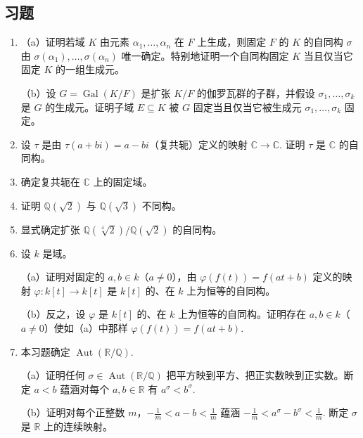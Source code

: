 \subsection*{习题}

\begin{enumerate}
\item （a）证明若域 \(K\) 由元素 \(\alpha_1, \ldots, \alpha_n\) 在 \(F\) 上生成，则固定 \(F\) 的 \(K\) 的自同构 \(\sigma\) 由 \(\sigma(\alpha_1), \ldots, \sigma(\alpha_n)\) 唯一确定。特别地证明一个自同构固定 \(K\) 当且仅当它固定 \(K\) 的一组生成元。

（b）设 \(G = \operatorname{Gal}(K/F)\) 是扩张 \(K/F\) 的伽罗瓦群的子群，并假设 \(\sigma_1, \ldots, \sigma_k\) 是 \(G\) 的生成元。证明子域 \(E \subseteq K\) 被 \(G\) 固定当且仅当它被生成元 \(\sigma_1, \ldots, \sigma_k\) 固定。

\item 设 \(\tau\) 是由 \(\tau(a+bi) = a-bi\)（复共轭）定义的映射 \(\mathbb{C} \to \mathbb{C}\). 证明 \(\tau\) 是 \(\mathbb{C}\) 的自同构。

\item 确定复共轭在 \(\mathbb{C}\) 上的固定域。

\item 证明 \(\mathbb{Q}(\sqrt{2})\) 与 \(\mathbb{Q}(\sqrt{3})\) 不同构。

\item 显式确定扩张 \(\mathbb{Q}(\sqrt[4]{2})/\mathbb{Q}(\sqrt{2})\) 的自同构。

\item 设 \(k\) 是域。

（a）证明对固定的 \(a, b \in k\)（\(a \neq 0\)），由 \(\varphi(f(t)) = f(at+b)\) 定义的映射 \(\varphi : k[t] \to k[t]\) 是 \(k[t]\) 的、在 \(k\) 上为恒等的自同构。

（b）反之，设 \(\varphi\) 是 \(k[t]\) 的、在 \(k\) 上为恒等的自同构。证明存在 \(a, b \in k\)（\(a \neq 0\)）使如（a）中那样 \(\varphi(f(t)) = f(at+b)\).

\item 本习题确定 \(\operatorname{Aut}(\mathbb{R}/\mathbb{Q})\).

（a）证明任何 \(\sigma \in \operatorname{Aut}(\mathbb{R}/\mathbb{Q})\) 把平方映到平方、把正实数映到正实数。断定 \(a < b\) 蕴涵对每个 \(a, b \in \mathbb{R}\) 有 \(a^\sigma < b^\sigma\).

（b）证明对每个正整数 \(m\)，\(-\frac{1}{m} < a-b < \frac{1}{m}\) 蕴涵 \(-\frac{1}{m} < a^\sigma-b^\sigma < \frac{1}{m}\). 断定 \(\sigma\) 是 \(\mathbb{R}\) 上的连续映射。


\end{enumerate}
